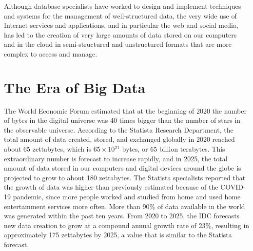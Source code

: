 Although database specialists have worked to design and implement techniques and systems for the management of well-structured data, the very wide use of Internet services and applications, and in particular the web and social media, has led to the creation of very large amounts of data stored on our computers and in the cloud in semi-structured and unstructured formats that are more complex to access and manage.

\section{\label{sec:3.5}The Era of Big Data}

The World Economic Forum estimated that at the beginning of 2020 the number of bytes in the digital universe was 40 times bigger than the number of stars in the observable universe. According to the Statista Research Department, the total amount of data created, stored, and exchanged globally in 2020 reached about 65 zettabytes, which is $65\times10{}^{21}$ bytes, or 65 billion terabytes. This extraordinary number is forecast to increase rapidly, and in 2025, the total amount of data stored in our computers and digital devices around the globe is projected to grow to about 180 zettabytes. The Statista specialists reported that the growth of data was higher than previously estimated because of the COVID-19 pandemic, since more people worked and studied from home and used home entertainment services more often. More than 90\% of data available in the world was generated within the past ten years. From 2020 to 2025, the IDC forecasts new data creation to grow at a compound annual growth rate of 23\%, resulting in approximately 175 zettabytes by 2025, a value that is similar to the Statista forecast.

